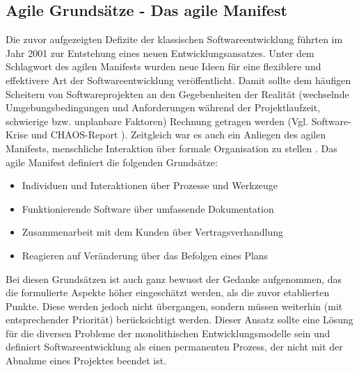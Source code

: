 \subsection{Agile Grundsätze - Das agile Manifest}
\label{Agile Grundsaetze - Das agile Manifest}
Die zuvor aufgezeigten Defizite der klassischen Softwareentwicklung führten im Jahr 2001 zur Entstehung eines neuen Entwicklungsansatzes. Unter dem Schlagwort des agilen Manifests wurden neue Ideen für eine flexiblere und effektivere Art der Softwareentwicklung veröffentlicht. Damit sollte dem häufigen Scheitern von Softwareprojekten an den Gegebenheiten der Realität (wechselnde Umgebungsbedingungen und Anforderungen während der Projektlaufzeit, schwierige bzw. unplanbare Faktoren) Rechnung getragen werden (Vgl. \glqq{}Software-Krise\grqq{} und CHAOS-Report \cite{noauthor_standish_1995}). Zeitgleich war es auch ein Anliegen des agilen Manifests, menschliche Interaktion über formale Organisation zu stellen \cite{beck_manifest_2001}.
Das agile Manifest definiert die folgenden Grundsätze:
\begin{itemize}
    \item Individuen und Interaktionen über Prozesse und Werkzeuge
    \item Funktionierende Software über umfassende Dokumentation
    \item Zusammenarbeit mit dem Kunden über Vertragsverhandlung
    \item Reagieren auf Veränderung über das Befolgen eines Plans
\end{itemize}
Bei diesen Grundsätzen ist auch ganz bewusst der Gedanke aufgenommen, das die formulierte Aspekte höher eingeschätzt werden, als die zuvor etablierten Punkte. Diese werden jedoch nicht übergangen, sondern müssen weiterhin (mit entsprechender Priorität) berücksichtigt werden.
Dieser Ansatz sollte eine Lösung für die diversen Probleme der monolithischen Entwicklungsmodelle sein und definiert Softwareentwicklung als einen permanenten Prozess, der nicht mit der Abnahme eines Projektes beendet ist.
